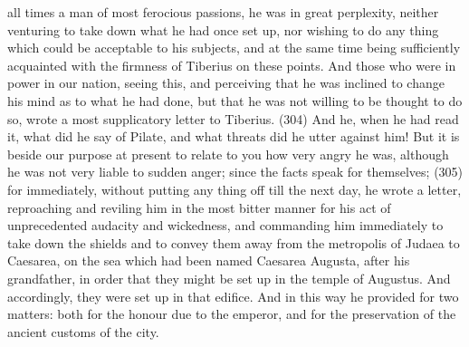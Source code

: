 all times a man of most ferocious passions, he was in great perplexity, neither venturing to take
down what he had once set up, nor wishing to do any thing which could be acceptable to his
subjects, and at the same time being sufficiently acquainted with the firmness of Tiberius on these
points. And those who were in power in our nation, seeing this, and perceiving that he was inclined
to change his mind as to what he had done, but that he was not willing to be thought to do so, wrote
a most supplicatory letter to Tiberius. (304) And he, when he had read it, what did he say of Pilate,
and what threats did he utter against him! But it is beside our purpose at present to relate to you
how very angry he was, although he was not very liable to sudden anger; since the facts speak for
themselves; (305) for immediately, without putting any thing off till the next day, he wrote a letter,
reproaching and reviling him in the most bitter manner for his act of unprecedented audacity and
wickedness, and commanding him immediately to take down the shields and to convey them away
from the metropolis of Judaea to Caesarea, on the sea which had been named Caesarea
Augusta, after his grandfather, in order that they might be set up in the temple of Augustus. And
accordingly, they were set up in that edifice. And in this way he provided for two matters: both for
the honour due to the emperor, and for the preservation of the ancient customs of the city.

